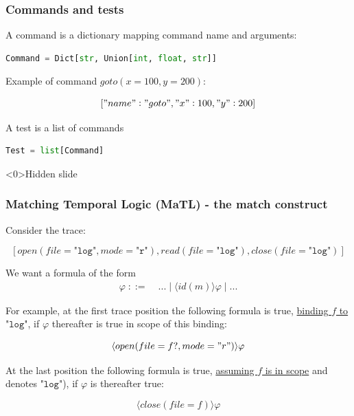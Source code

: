 
\begin{frame}[fragile]
  \frametitle{Commands and tests} \small

\begin{definition}[Command]
A command is a dictionary mapping command name and arguments:

\begin{lstlisting}[language=python,frame=single]
Command = Dict[str, Union[int, float, str]]
\end{lstlisting}
\end{definition}

Example of command $goto(x=100,y=200)$:

\[
["name" : "goto", "x": 100, "y": 200]
\]

\pause
\begin{definition}[Test]
A test is a list of commands

\begin{lstlisting}[language=python,frame=single]
Test = list[Command]
\end{lstlisting}
\end{definition}

\end{frame}

\begin{frame}<0>{Hidden slide}
  \frametitle{Matching Temporal Logic (MaTL) - the match construct} \small

Consider the trace:

\[ 
[ 
open(file=\texttt{"log"}, mode=\texttt{"r"}),
read(file=\texttt{"log"}),
close(file=\texttt{"log"})
]
\]

\pause

\begin{block}{We want a formula of the form}
\begin{equation*}
\begin{aligned}
\varphi \;::=&\; ...  \;|\; \langle id(m) \rangle \varphi \;|\; ...
\end{aligned}
\end{equation*}
\end{block}

\pause

\vspace{0.2cm}

For example, at the first trace position the following formula is true,
\underline{binding $f$ to $\texttt{"log"}$},
if $\varphi$ thereafter is true in scope of this binding:

\[
\langle open(file=f?, mode="r") \rangle \varphi
\]

\pause

\vspace{0.2cm}

At the last position the following formula is true, \underline{assuming $f$ is in scope} and denotes $\texttt{"log"}$), if $\varphi$ is thereafter true:

\[
\langle close(file=f) \rangle \varphi
\]

\end{frame}

